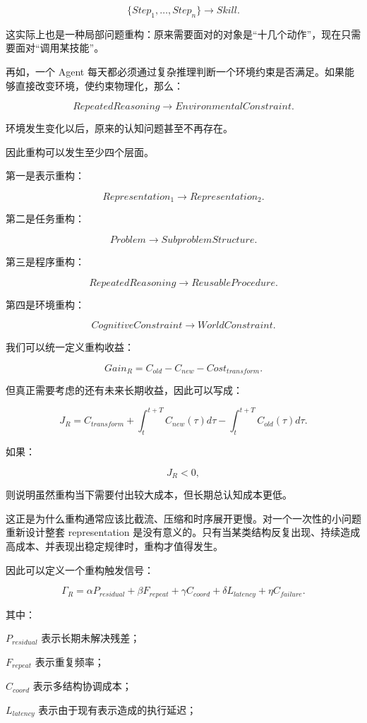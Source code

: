 \[
\{Step_1,\ldots,Step_n\}
\rightarrow
Skill.
\]

这实际上也是一种局部问题重构：原来需要面对的对象是“十几个动作”，现在只需要面对“调用某技能”。

再如，一个 Agent 每天都必须通过复杂推理判断一个环境约束是否满足。如果能够直接改变环境，使约束物理化，那么：

\[
RepeatedReasoning
\rightarrow
EnvironmentalConstraint.
\]

环境发生变化以后，原来的认知问题甚至不再存在。

因此重构可以发生至少四个层面。

第一是表示重构：

\[
Representation_1
\rightarrow
Representation_2.
\]

第二是任务重构：

\[
Problem
\rightarrow
SubproblemStructure.
\]

第三是程序重构：

\[
RepeatedReasoning
\rightarrow
ReusableProcedure.
\]

第四是环境重构：

\[
CognitiveConstraint
\rightarrow
WorldConstraint.
\]

我们可以统一定义重构收益：

\[
Gain_R
=
C_{old}
-
C_{new}
-
Cost_{transform}.
\]

但真正需要考虑的还有未来长期收益，因此可以写成：

\[
J_R
=
C_{transform}
+
\int_{t}^{t+T}
C_{new}(\tau)d\tau
-
\int_{t}^{t+T}
C_{old}(\tau)d\tau.
\]

如果：

\[
J_R<0,
\]

则说明虽然重构当下需要付出较大成本，但长期总认知成本更低。

这正是为什么重构通常应该比截流、压缩和时序展开更慢。对一个一次性的小问题重新设计整套 representation 是没有意义的。只有当某类结构反复出现、持续造成高成本、并表现出稳定规律时，重构才值得发生。

因此可以定义一个重构触发信号：

\[
\Gamma_R
=
\alpha P_{residual}
+
\beta F_{repeat}
+
\gamma C_{coord}
+
\delta L_{latency}
+
\eta C_{failure}.
\]

其中：

$P_{residual}$ 表示长期未解决残差；

$F_{repeat}$ 表示重复频率；

$C_{coord}$ 表示多结构协调成本；

$L_{latency}$ 表示由于现有表示造成的执行延迟；

